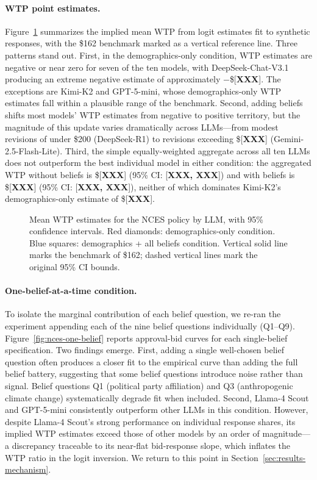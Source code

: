 \documentclass[12pt]{article}
\begin{document}
\paragraph{WTP point estimates.} Figure~\ref{fig:nces-wtp} summarizes the implied mean WTP from logit estimates fit to synthetic responses, with the \$162 benchmark marked as a vertical reference line. Three patterns stand out. First, in the demographics-only condition, WTP estimates are negative or near zero for seven of the ten models, with DeepSeek-Chat-V3.1 producing an extreme negative estimate of approximately $-$\$[\textbf{XXX}]. The exceptions are Kimi-K2 and GPT-5-mini, whose demographics-only WTP estimates fall within a plausible range of the benchmark. Second, adding beliefs shifts most models' WTP estimates from negative to positive territory, but the magnitude of this update varies dramatically across LLMs---from modest revisions of under \$200 (DeepSeek-R1) to revisions exceeding \$[\textbf{XXX}] (Gemini-2.5-Flash-Lite). Third, the simple equally-weighted aggregate across all ten LLMs does not outperform the best individual model in either condition: the aggregated WTP without beliefs is \$[\textbf{XXX}] (95\% CI: [\textbf{XXX, XXX}]) and with beliefs is \$[\textbf{XXX}] (95\% CI: [\textbf{XXX, XXX}]), neither of which dominates Kimi-K2's demographics-only estimate of \$[\textbf{XXX}].

\begin{figure}[h]
    \centering
    \caption{Mean WTP estimates for the NCES policy by LLM, with 95\% confidence intervals. Red diamonds: demographics-only condition. Blue squares: demographics + all beliefs condition. Vertical solid line marks the \textcite{Aldy2012} benchmark of \$162; dashed vertical lines mark the original 95\% CI bounds.}
    \label{fig:nces-wtp}
\end{figure}

\paragraph{One-belief-at-a-time condition.} To isolate the marginal contribution of each belief question, we re-ran the experiment appending each of the nine belief questions individually (Q1--Q9). Figure~\ref{fig:nces-one-belief} reports approval-bid curves for each single-belief specification. Two findings emerge. First, adding a single well-chosen belief question often produces a closer fit to the empirical curve than adding the full belief battery, suggesting that some belief questions introduce noise rather than signal. Belief questions Q1 (political party affiliation) and Q3 (anthropogenic climate change) systematically degrade fit when included. Second, Llama-4 Scout and GPT-5-mini consistently outperform other LLMs in this condition. However, despite Llama-4 Scout's strong performance on individual response shares, its implied WTP estimates exceed those of other models by an order of magnitude---a discrepancy traceable to its near-flat bid-response slope, which inflates the WTP ratio in the logit inversion. We return to this point in Section~\ref{sec:results-mechanism}.
\end{document}
